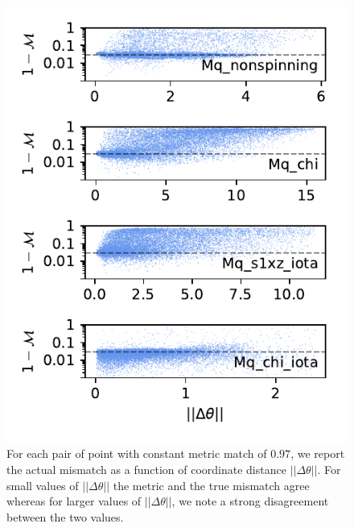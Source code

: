 \documentclass[twocolumn,showpacs,preprintnumbers,nofootinbib,prd,
superscriptaddress,10pt]{revtex4-2}
\begin{document}
\begin{figure}[t]
	\includegraphics{metric_accuracy_hessian_distance}
	\caption{For each pair of point with constant metric match of $0.97$, we report the actual mismatch as a function of coordinate distance $||\Delta\theta||$. For small values of $||\Delta\theta||$ the metric and the true mismatch agree whereas for larger values of $||\Delta\theta||$, we note a strong disagreement between the two values.
	}
	\label{fig:metric_accuracy_distance}
\end{figure}
\end{document}
